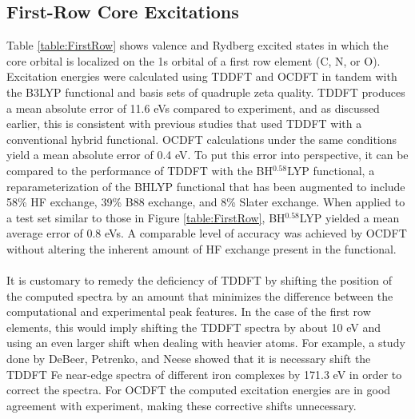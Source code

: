 \documentclass[12pt]{article}
\begin{document}
\subsection{First-Row Core Excitations}
\noindent Table \ref{table:FirstRow} shows valence and Rydberg excited states in which the core orbital is localized on the 1s orbital of a first row element (C, N, or O). Excitation energies were calculated using TDDFT and OCDFT in tandem with the B3LYP functional and basis sets of quadruple zeta quality. TDDFT produces a mean absolute error of 11.6 eVs compared to experiment, and as discussed earlier, this is consistent with previous studies that used TDDFT with a conventional hybrid functional.\cite{besley_self-consistent-field_2009} OCDFT calculations under the same conditions yield a mean absolute error of 0.4 eV. To put this error into perspective, it can be compared to the performance of TDDFT with the BH$^{0.58}$LYP functional,\cite{besley_time-dependent_2009} a reparameterization of the BHLYP functional that has been augmented to include 58\% HF exchange, 39\% B88 exchange, and 8\% Slater exchange. When applied to a test set similar to those in Figure \ref{table:FirstRow}, BH$^{0.58}$LYP yielded a mean average error of 0.8 eVs. A comparable level of accuracy was achieved by OCDFT without altering the inherent amount of HF exchange present in the functional.
\\ \\
It is customary to remedy the deficiency of TDDFT by shifting the position of the computed spectra by an amount that minimizes the difference between the computational and experimental peak features. In the case of the first row elements, this would imply shifting the TDDFT spectra by about 10 eV and using an even larger shift when dealing with heavier atoms. For example, a study done by DeBeer, Petrenko, and Neese\cite{debeer_george_prediction_2008} showed that it is necessary shift the TDDFT Fe near-edge spectra of different iron complexes by 171.3 eV in order to correct the spectra. For OCDFT the computed excitation energies are in good agreement with experiment, making these corrective shifts unnecessary.
\\ \\ 
\end{document}
